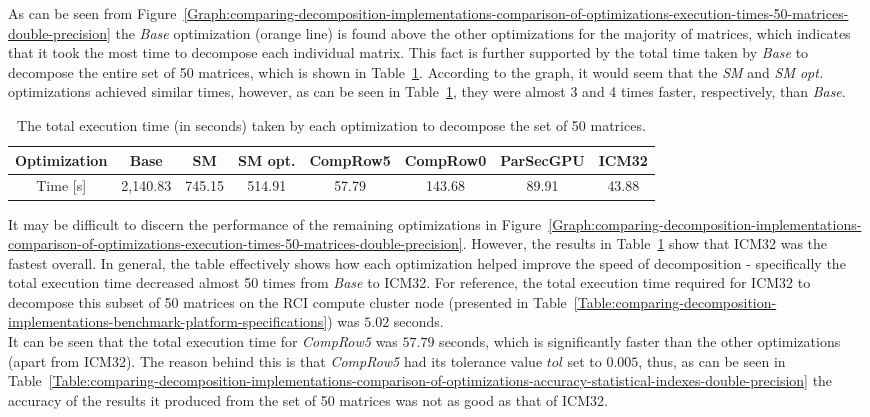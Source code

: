 As can be seen from Figure~\ref{Graph:comparing-decomposition-implementations-comparison-of-optimizations-execution-times-50-matrices-double-precision} the \textit{Base} optimization (orange line) is found above the other optimizations for the majority of matrices, which indicates that it took the most time to decompose each individual matrix. This fact is further supported by the total time taken by \textit{Base} to decompose the entire set of 50 matrices, which is shown in Table~\ref{Table:comparing-decomposition-implementations-comparison-of-optimizations-total-execution-time}. According to the graph, it would seem that the \textit{SM} and \textit{SM opt.} optimizations achieved similar times, however, as can be seen in Table~\ref{Table:comparing-decomposition-implementations-comparison-of-optimizations-total-execution-time}, they were almost 3 and 4 times faster, respectively, than \textit{Base}.

\begin{table}[ht!]
	\centering
	\renewcommand{\arraystretch}{1.5}
	\begin{tabular}{ |c|c|c|c|c|c|c|c| } 
		\hline
		Optimization & Base    & SM     & SM opt. & CompRow5 & CompRow0 & ParSecGPU & ICM32 \\
		\hline
		Time [s]     & 2,140.83 & 745.15 & 514.91  & 57.79      & 143.68   &  89.91    & 43.88 \\
		\hline
	\end{tabular}
	\caption{The total execution time (in seconds) taken by each optimization to decompose the set of 50 matrices.}
	\label{Table:comparing-decomposition-implementations-comparison-of-optimizations-total-execution-time}
\end{table}

It may be difficult to discern the performance of the remaining optimizations in Figure~\ref{Graph:comparing-decomposition-implementations-comparison-of-optimizations-execution-times-50-matrices-double-precision}. However, the results in Table~\ref{Table:comparing-decomposition-implementations-comparison-of-optimizations-total-execution-time} show that ICM32 was the fastest overall. In general, the table effectively shows how each optimization helped improve the speed of decomposition - specifically the total execution time decreased almost 50 times from \textit{Base} to ICM32. For reference, the total execution time required for ICM32 to decompose this subset of 50 matrices on the RCI compute cluster node (presented in Table~\ref{Table:comparing-decomposition-implementations-benchmark-platform-specifications}) was $ 5.02 $ seconds. \\
It can be seen that the total execution time for \textit{CompRow5} was $ 57.79 $ seconds, which is significantly faster than the other optimizations (apart from ICM32). The reason behind this is that \textit{CompRow5} had its tolerance value $ tol $ set to $ 0.005 $, thus, as can be seen in Table~\ref{Table:comparing-decomposition-implementations-comparison-of-optimizations-accuracy-statistical-indexes-double-precision} the accuracy of the results it produced from the set of 50 matrices was not as good as that of ICM32.

